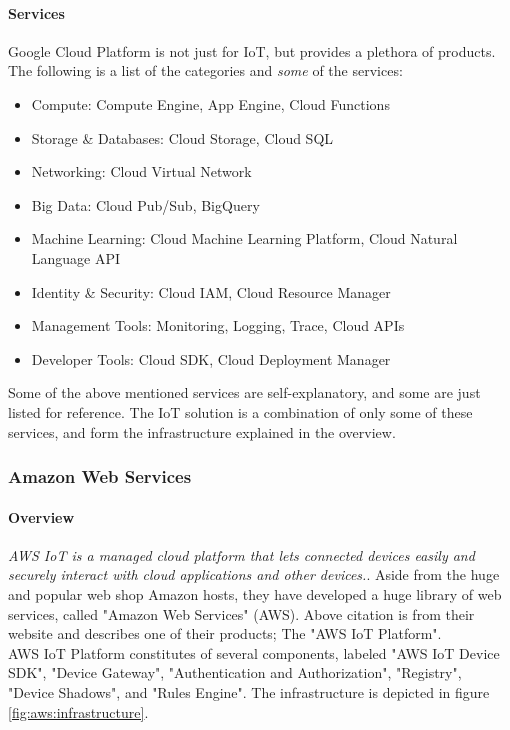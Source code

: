 \paragraph{Services}
Google Cloud Platform is not just for IoT, but provides a plethora of products. The following is a list of the categories and \textit{some} of the services:

\begin{itemize}
	\item Compute: Compute Engine, App Engine, Cloud Functions
	\item Storage \& Databases: Cloud Storage, Cloud SQL
	\item Networking: Cloud Virtual Network
	\item Big Data: Cloud Pub/Sub, BigQuery
	\item Machine Learning: Cloud Machine Learning Platform, Cloud Natural Language API
	\item Identity \& Security: Cloud IAM, Cloud Resource Manager
	\item Management Tools: Monitoring, Logging, Trace, Cloud APIs
	\item Developer Tools: Cloud SDK, Cloud Deployment Manager
\end{itemize}

Some of the above mentioned services are self-explanatory, and some are just listed for reference. The IoT solution is a combination of only some of these services, and form the infrastructure explained in the overview. 

\subsubsection{Amazon Web Services}
\paragraph{Overview} \textit{AWS IoT is a managed cloud platform that lets connected devices easily and securely interact with cloud applications and other devices.}\cite{website:aws}.
Aside from the huge and popular web shop Amazon hosts, they have developed a huge library of web services, called "Amazon Web Services" (AWS). Above citation is from their website and describes one of their products; The "AWS IoT Platform". \\

AWS IoT Platform constitutes of several components, labeled "AWS IoT Device SDK", "Device Gateway", "Authentication and Authorization", "Registry", "Device Shadows", and "Rules Engine". The infrastructure is depicted in figure \ref{fig:aws:infrastructure}. \\

